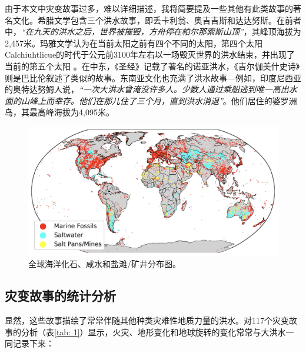 \documentclass[10pt,twocolumn,letterpaper]{article}
\begin{document}
由于本文中灾变故事过多，难以详细描述，我将简要提及一些其他有此类故事的著名文化。希腊文学包含三个洪水故事，即丢卡利翁、奥吉吉斯和达达努斯\cite{9,10}。在前者中，\textit{“在九天的洪水之后，世界被摧毁，方舟停在帕尔那索斯山顶”}，其峰顶海拔为2,457米\cite{11}。玛雅文学认为在当前太阳之前有四个不同的太阳，第四个太阳Calchiuhtlicue的时代于公元前3100年左右以一场毁灭世界的洪水结束，并出现了当前的第五个太阳 \cite{12}。在中东，《圣经》记载了著名的诺亚洪水，《吉尔伽美什史诗》则是巴比伦叙述了类似的故事\cite{13}。东南亚文化也充满了洪水故事—例如，印度尼西亚的奥特达努姆人说，\textit{“一次大洪水曾淹没许多人。少数人通过乘船逃到唯一高出水面的山峰上而幸存。他们在那儿住了三个月，直到洪水消退”}\cite{3}。他们居住的婆罗洲岛，其最高峰海拔为4,095米。

\begin{figure}[t]
\begin{center}
\includegraphics[width=1\textwidth]{marine.jpg}
\end{center}
   \caption{全球海洋化石、咸水和盐滩/矿井分布图\cite{15,16,86,87}。}
   \label{fig:2}
\end{figure}

\subsection{灾变故事的统计分析}

显然，这些故事描绘了常常伴随其他种类灾难性地质力量的洪水。对117个灾变故事的分析（表\ref{tab: 1}）显示，火灾、地形变化和地球旋转的变化常常与大洪水一同记录下来\cite{14}：
\end{document}
